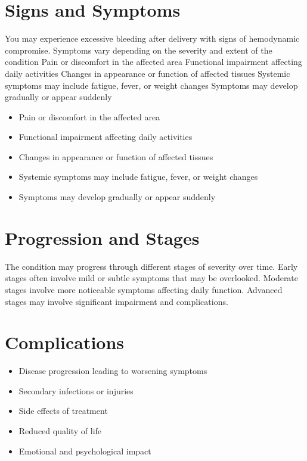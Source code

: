 \section{Signs and Symptoms}
You may experience excessive bleeding after delivery with signs of hemodynamic compromise. Symptoms vary depending on the severity and extent of the condition Pain or discomfort in the affected area Functional impairment affecting daily activities Changes in appearance or function of affected tissues Systemic symptoms may include fatigue, fever, or weight changes Symptoms may develop gradually or appear suddenly

\begin{itemize}[noitemsep]
  \item Pain or discomfort in the affected area
  \item Functional impairment affecting daily activities
  \item Changes in appearance or function of affected tissues
  \item Systemic symptoms may include fatigue, fever, or weight changes
  \item Symptoms may develop gradually or appear suddenly
\end{itemize}
\section{Progression and Stages}
The condition may progress through different stages of severity over time. Early stages often involve mild or subtle symptoms that may be overlooked. Moderate stages involve more noticeable symptoms affecting daily function. Advanced stages may involve significant impairment and complications.
\section{Complications}
\begin{itemize}[noitemsep]
  \item Disease progression leading to worsening symptoms
  \item Secondary infections or injuries
  \item Side effects of treatment
  \item Reduced quality of life
  \item Emotional and psychological impact
\end{itemize}
